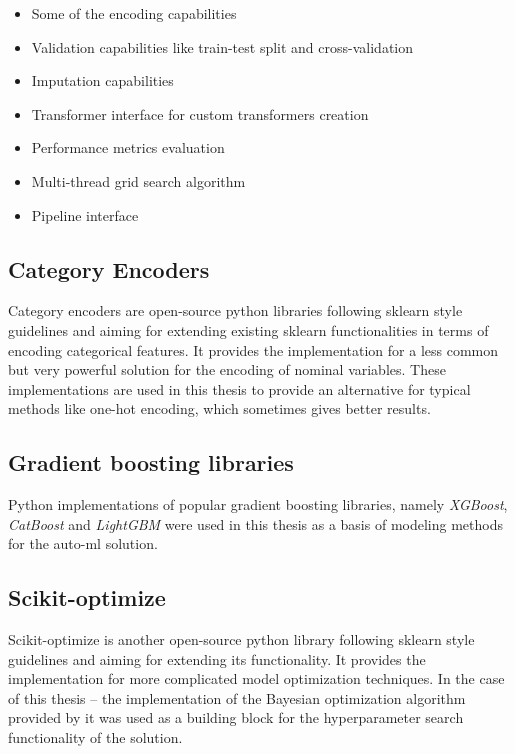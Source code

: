 \documentclass[a4paper,twoside,12pt]{book}
\begin{document}
\begin{itemize}
    \item Some of the encoding capabilities
    \item Validation capabilities like train-test split and cross-validation
    \item Imputation capabilities
    \item Transformer interface for custom transformers creation
    \item Performance metrics evaluation
    \item Multi-thread grid search algorithm
    \item Pipeline interface
\end{itemize}

\subsection{Category Encoders}

Category encoders are open-source python libraries following sklearn style guidelines and aiming for extending existing sklearn functionalities in terms of encoding categorical features.
It provides the implementation for a less common but very powerful solution for the encoding of nominal variables.
These implementations are used in this thesis to provide an alternative for typical methods like one-hot encoding, which sometimes gives better results.

\subsection{Gradient boosting libraries}

Python implementations of popular gradient boosting libraries, namely \emph{XGBoost}, \emph{CatBoost} and \emph{LightGBM} were used in this thesis as a basis of modeling methods for the auto-ml solution.



\subsection{Scikit-optimize}

Scikit-optimize is another open-source python library following sklearn style guidelines and aiming for extending its functionality. It provides the implementation for more complicated model optimization techniques.
In the case of this thesis -- the implementation of the Bayesian optimization algorithm provided by it was used as a building block for the hyperparameter search functionality of the solution. 
\end{document}
